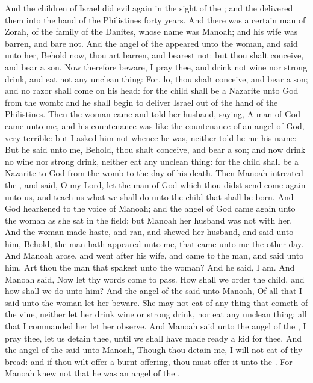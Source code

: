 \begin{biblechapter} %
 And the children of Israel did evil again in the sight of the \LORD; and the \LORD delivered them into the hand of the Philistines forty years.
\verse And there was a certain man of Zorah, of the family of the Danites, whose name was Manoah; and his wife was barren, and bare not.
\verse And the angel of the \LORD appeared unto the woman, and said unto her, Behold now, thou art barren, and bearest not: but thou shalt conceive, and bear a son.
\verse Now therefore beware, I pray thee, and drink not wine nor strong drink, and eat not any unclean thing:
\verse For, lo, thou shalt conceive, and bear a son; and no razor shall come on his head: for the child shall be a Nazarite unto God from the womb: and he shall begin to deliver Israel out of the hand of the Philistines.
\verse Then the woman came and told her husband, saying, A man of God came unto me, and his countenance was like the countenance of an angel of God, very terrible: but I asked him not whence he was, neither told he me his name:
\verse But he said unto me, Behold, thou shalt conceive, and bear a son; and now drink no wine nor strong drink, neither eat any unclean thing: for the child shall be a Nazarite to God from the womb to the day of his death.
\verse Then Manoah intreated the \LORD, and said, O my Lord, let the man of God which thou didst send come again unto us, and teach us what we shall do unto the child that shall be born.
\verse And God hearkened to the voice of Manoah; and the angel of God came again unto the woman as she sat in the field: but Manoah her husband was not with her.
\verse And the woman made haste, and ran, and shewed her husband, and said unto him, Behold, the man hath appeared unto me, that came unto me the other day.
\verse And Manoah arose, and went after his wife, and came to the man, and said unto him, Art thou the man that spakest unto the woman? And he said, I am.
\verse And Manoah said, Now let thy words come to pass. How shall we order the child, and how shall we do unto him?
\verse And the angel of the \LORD said unto Manoah, Of all that I said unto the woman let her beware.
\verse She may not eat of any thing that cometh of the vine, neither let her drink wine or strong drink, nor eat any unclean thing: all that I commanded her let her observe.
\verse And Manoah said unto the angel of the \LORD, I pray thee, let us detain thee, until we shall have made ready a kid for thee.
\verse And the angel of the \LORD said unto Manoah, Though thou detain me, I will not eat of thy bread: and if thou wilt offer a burnt offering, thou must offer it unto the \LORD. For Manoah knew not that he was an angel of the \LORD.

\end{biblechapter}
